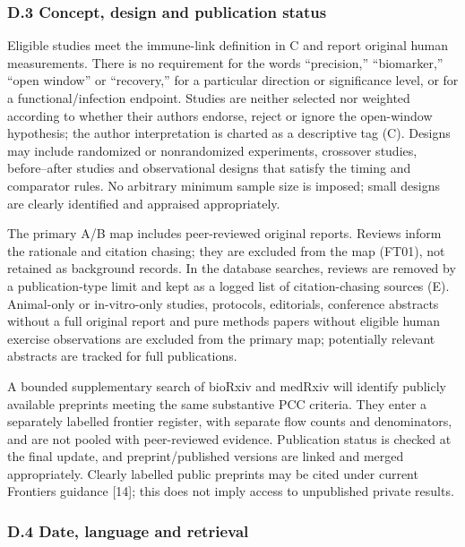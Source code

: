 \documentclass[
  11pt,
  a4paper,
]{article}
\begin{document}
\subsubsection{D.3 Concept, design and publication
status}\label{d.3-concept-design-and-publication-status}

Eligible studies meet the immune-link definition in C and report
original human measurements. There is no requirement for the words
``precision,'' ``biomarker,'' ``open window'' or ``recovery,'' for a
particular direction or significance level, or for a
functional/infection endpoint. Studies are neither selected nor weighted
according to whether their authors endorse, reject or ignore the
open-window hypothesis; the author interpretation is charted as a
descriptive tag (C). Designs may include randomized or nonrandomized
experiments, crossover studies, before--after studies and observational
designs that satisfy the timing and comparator rules. No arbitrary
minimum sample size is imposed; small designs are clearly identified and
appraised appropriately.

The primary A/B map includes peer-reviewed original reports. Reviews
inform the rationale and citation chasing; they are excluded from the
map (FT01), not retained as background records. In the database
searches, reviews are removed by a publication-type limit and kept as a
logged list of citation-chasing sources (E). Animal-only or
in-vitro-only studies, protocols, editorials, conference abstracts
without a full original report and pure methods papers without eligible
human exercise observations are excluded from the primary map;
potentially relevant abstracts are tracked for full publications.

A bounded supplementary search of bioRxiv and medRxiv will identify
publicly available preprints meeting the same substantive PCC criteria.
They enter a separately labelled frontier register, with separate flow
counts and denominators, and are not pooled with peer-reviewed evidence.
Publication status is checked at the final update, and
preprint/published versions are linked and merged appropriately. Clearly
labelled public preprints may be cited under current Frontiers guidance
{[}14{]}; this does not imply access to unpublished private results.

\subsubsection{D.4 Date, language and
retrieval}\label{d.4-date-language-and-retrieval}
\end{document}
